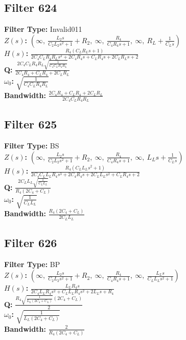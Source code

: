 \documentclass{article}
\begin{document}
\subsection*{Filter 624}
\textbf{Filter Type:} Invalid011 \\ 
\textbf{$Z(s)$:} $\left( \infty, \  \frac{L_{2} s}{C_{2} L_{2} s^{2} + 1} + R_{2}, \  \infty, \  \frac{R_{4}}{C_{4} R_{4} s + 1}, \  \infty, \  R_{L} + \frac{1}{C_{L} s}\right)$ \\ 
\textbf{$H(s)$:} $\frac{R_{4} \left(C_{L} R_{L} s + 1\right)}{2 C_{4} C_{L} R_{4} R_{L} s^{2} + 2 C_{4} R_{4} s + C_{L} R_{4} s + 2 C_{L} R_{L} s + 2}$ \\ 
\textbf{Q:} $\frac{2 C_{4} C_{L} R_{4} R_{L} \sqrt{\frac{1}{C_{4} C_{L} R_{4} R_{L}}}}{2 C_{4} R_{4} + C_{L} R_{4} + 2 C_{L} R_{L}}$ \\ 
\textbf{$\omega_0$:} $\sqrt{\frac{1}{C_{4} C_{L} R_{4} R_{L}}}$ \\ 
\textbf{Bandwidth:} $\frac{2 C_{4} R_{4} + C_{L} R_{4} + 2 C_{L} R_{L}}{2 C_{4} C_{L} R_{4} R_{L}}$ \\ 
\subsection*{Filter 625}
\textbf{Filter Type:} BS \\ 
\textbf{$Z(s)$:} $\left( \infty, \  \frac{L_{2} s}{C_{2} L_{2} s^{2} + 1} + R_{2}, \  \infty, \  \frac{R_{4}}{C_{4} R_{4} s + 1}, \  \infty, \  L_{L} s + \frac{1}{C_{L} s}\right)$ \\ 
\textbf{$H(s)$:} $\frac{R_{4} \left(C_{L} L_{L} s^{2} + 1\right)}{2 C_{4} C_{L} L_{L} R_{4} s^{3} + 2 C_{4} R_{4} s + 2 C_{L} L_{L} s^{2} + C_{L} R_{4} s + 2}$ \\ 
\textbf{Q:} $\frac{2 C_{L} L_{L} \sqrt{\frac{1}{C_{L} L_{L}}}}{R_{4} \left(2 C_{4} + C_{L}\right)}$ \\ 
\textbf{$\omega_0$:} $\sqrt{\frac{1}{C_{L} L_{L}}}$ \\ 
\textbf{Bandwidth:} $\frac{R_{4} \left(2 C_{4} + C_{L}\right)}{2 C_{L} L_{L}}$ \\ 
\subsection*{Filter 626}
\textbf{Filter Type:} BP \\ 
\textbf{$Z(s)$:} $\left( \infty, \  \frac{L_{2} s}{C_{2} L_{2} s^{2} + 1} + R_{2}, \  \infty, \  \frac{R_{4}}{C_{4} R_{4} s + 1}, \  \infty, \  \frac{L_{L} s}{C_{L} L_{L} s^{2} + 1}\right)$ \\ 
\textbf{$H(s)$:} $\frac{L_{L} R_{4} s}{2 C_{4} L_{L} R_{4} s^{2} + C_{L} L_{L} R_{4} s^{2} + 2 L_{L} s + R_{4}}$ \\ 
\textbf{Q:} $\frac{R_{4} \sqrt{\frac{1}{L_{L} \left(2 C_{4} + C_{L}\right)}} \left(2 C_{4} + C_{L}\right)}{2}$ \\ 
\textbf{$\omega_0$:} $\sqrt{\frac{1}{L_{L} \left(2 C_{4} + C_{L}\right)}}$ \\ 
\textbf{Bandwidth:} $\frac{2}{R_{4} \left(2 C_{4} + C_{L}\right)}$ \\ 
\end{document}
